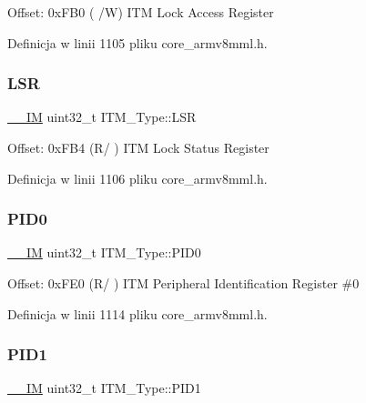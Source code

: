 Offset\+: 0x\+F\+B0 ( /W) I\+TM Lock Access Register 

Definicja w linii 1105 pliku core\+\_\+armv8mml.\+h.

\mbox{\label{struct_i_t_m___type_a3861c67933a24dd6632288c4ed0b80c8}} 
\subsubsection{\texorpdfstring{L\+SR}{LSR}}
{\footnotesize\ttfamily \hyperlink{core__sc300_8h_a4cc1649793116d7c2d8afce7a4ffce43}{\+\_\+\+\_\+\+IM} uint32\+\_\+t I\+T\+M\+\_\+\+Type\+::\+L\+SR}

Offset\+: 0x\+F\+B4 (R/ ) I\+TM Lock Status Register 

Definicja w linii 1106 pliku core\+\_\+armv8mml.\+h.

\mbox{\label{struct_i_t_m___type_ab4a4cc97ad658e9c46cf17490daffb8a}} 
\subsubsection{\texorpdfstring{P\+I\+D0}{PID0}}
{\footnotesize\ttfamily \hyperlink{core__sc300_8h_a4cc1649793116d7c2d8afce7a4ffce43}{\+\_\+\+\_\+\+IM} uint32\+\_\+t I\+T\+M\+\_\+\+Type\+::\+P\+I\+D0}

Offset\+: 0x\+F\+E0 (R/ ) I\+TM Peripheral Identification Register \#0 

Definicja w linii 1114 pliku core\+\_\+armv8mml.\+h.

\mbox{\label{struct_i_t_m___type_a89ea1d805a668d6589b22d8e678eb6a4}} 
\subsubsection{\texorpdfstring{P\+I\+D1}{PID1}}
{\footnotesize\ttfamily \hyperlink{core__sc300_8h_a4cc1649793116d7c2d8afce7a4ffce43}{\+\_\+\+\_\+\+IM} uint32\+\_\+t I\+T\+M\+\_\+\+Type\+::\+P\+I\+D1}

